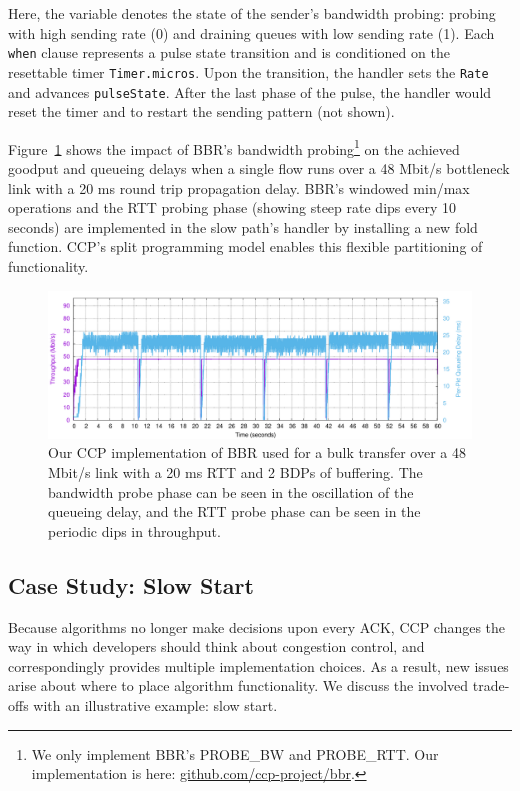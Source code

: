 Here, the variable  denotes the state of the sender's
bandwidth probing: probing with high sending rate (0) and draining queues with low
sending rate (1).
Each \texttt{when} clause represents a pulse state transition and is conditioned on the
resettable timer \texttt{Timer.micros}.
Upon the transition, the handler sets the \texttt{Rate} and advances \texttt{pulseState}.
After the last phase of the pulse, the handler would reset the timer and  to restart the sending pattern (not shown).

Figure~\ref{fig:ccp:bbr} shows
the impact of BBR's bandwidth probing\footnote{We only implement BBR's PROBE\_BW and PROBE\_RTT. Our implementation is here: \url{github.com/ccp-project/bbr}.} on the
achieved goodput and queueing delays when a single flow runs over a 48 Mbit/s
bottleneck link with a 20 ms round trip propagation delay.
%
BBR's windowed min/max operations and the RTT probing phase (showing steep rate
dips every 10 seconds) are implemented in the slow path's 
handler by installing a new fold function.
%
CCP's split programming model enables this flexible partitioning of functionality.

\begin{figure}[t]
\centering
    \includegraphics[width=\columnwidth]{img/bbr}
    \caption{
    Our CCP implementation of BBR used for a bulk transfer over a 48 Mbit/s link with a 20 ms RTT and 2 BDPs of buffering. The bandwidth probe phase can be seen in the oscillation of the queueing delay, and the RTT probe phase can be seen in the periodic dips in throughput.
    }\label{fig:ccp:bbr}
\end{figure}

\subsection{Case Study: Slow Start}
\label{s:ccp:ss}

Because algorithms no longer make decisions upon every ACK, CCP changes the way in which developers should think about congestion control, and correspondingly provides multiple implementation choices. As a result, new issues arise about where to place algorithm functionality. We discuss the involved trade-offs with an illustrative example: slow start.

